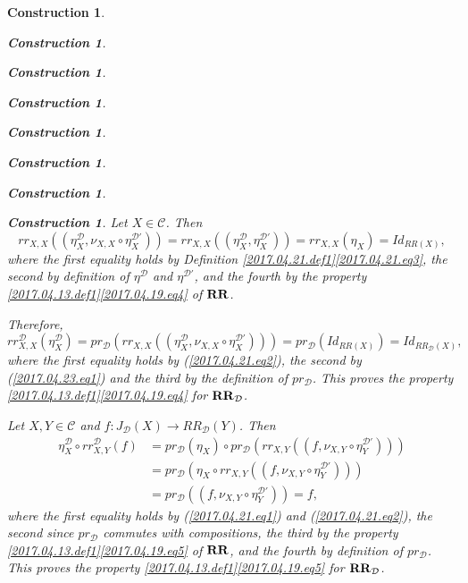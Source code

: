 \documentclass[12pt]{amsart}
\numberwithin{proposition}{subsection}
\newtheorem{construction}[proposition]{Construction}
\newcommand{\llabel}[1]{\label{#1}}
\newcommand{\sr}{\rightarrow}
\newcommand{\RR}{{\bf RR}}
\newcommand{\C}{{\mathcal C}}
\newcommand{\D}{{\mathcal D}}
\begin{document}
\begin{construction}
\begin{construction}
\begin{construction}
\begin{construction}
\begin{construction}
\begin{construction}
\begin{construction}
\begin{construction}
Let $X\in\C$. Then
%
\begin{equation}
\llabel{2017.04.23.eq1}
rr_{X,X}((\eta^{\D}_X,\nu_{X,X}\circ \eta^{\D'}_X))=
rr_{X,X}((\eta^{\D}_X,\eta^{\D'}_X))=
rr_{X,X}(\eta_X)=
Id_{RR(X)},
\end{equation}%
%
where the first equality holds by Definition
\ref{2017.04.21.def1}\ref{2017.04.21.eq3}, the second by definition of
$\eta^{\D}$ and $\eta^{\D'}$, and the fourth by the property
\ref{2017.04.13.def1}\ref{2017.04.19.eq4} of $\RR$.

Therefore,
%
$$rr^{\D}_{X,X}(\eta^{\D}_X)=
pr_{\D}(rr_{X,X}((\eta^{\D}_X,\nu_{X,X}\circ \eta^{\D'}_X)))=
pr_{\D}(Id_{RR(X)})=Id_{RR_{\D}(X)},$$
%
where the first equality holds by (\ref{2017.04.21.eq2}), the second by
(\ref{2017.04.23.eq1}) and the third by the definition of $pr_{\D}$. This
proves the property \ref{2017.04.13.def1}\ref{2017.04.19.eq4} for $\RR_{\D}$.

Let $X,Y\in\C$ and $f:J_{\D}(X)\sr RR_{\D}(Y)$. Then
%
\begin{equation}
  \llabel{2017.04.23.eq2}
  \begin{split}
    \eta^{\D}_X\circ rr^{\D}_{X,Y}(f)
    &=pr_{\D}(\eta_X)\circ pr_{\D}(rr_{X,Y}((f,\nu_{X,Y}\circ \eta^{\D'}_Y)))
    \\
    &=pr_{\D}(\eta_X\circ rr_{X,Y}((f,\nu_{X,Y}\circ \eta^{\D'}_Y)))
    \\
    &=pr_{\D}((f,\nu_{X,Y}\circ \eta^{\D'}_Y))=f,
  \end{split}
\end{equation}%
%
where the first equality holds by (\ref{2017.04.21.eq1}) and
(\ref{2017.04.21.eq2}), the second since $pr_{\D}$ commutes with compositions,
the third by the property \ref{2017.04.13.def1}\ref{2017.04.19.eq5} of $\RR$,
and the fourth by definition of $pr_{\D}$. This proves the property
\ref{2017.04.13.def1}\ref{2017.04.19.eq5} for $\RR_{\D}$.


\end{construction}
\end{construction}
\end{construction}
\end{construction}
\end{construction}
\end{construction}
\end{construction}
\end{construction}
\end{document}
